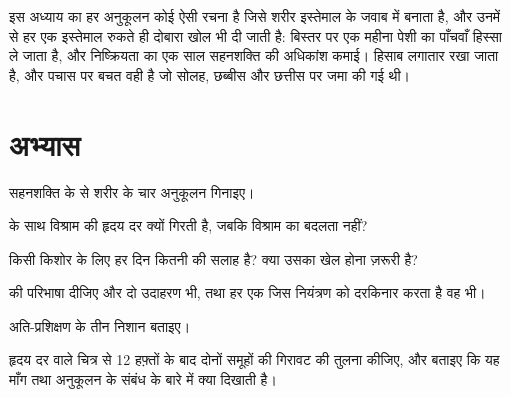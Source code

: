 \begin{remark}[शरीर हिसाब रखता है]\label{rem:g10:sport-and-health:account}
इस अध्याय का हर अनुकूलन कोई ऐसी रचना है जिसे शरीर इस्तेमाल के जवाब में
बनाता है, और उनमें से हर एक इस्तेमाल रुकते ही दोबारा खोल भी दी जाती है:
बिस्तर पर एक महीना पेशी का पाँचवाँ हिस्सा ले जाता है, और निष्क्रियता का
एक साल सहनशक्ति की अधिकांश कमाई। हिसाब लगातार रखा जाता है, और पचास पर बचत
वही है जो सोलह, छब्बीस और छत्तीस पर जमा की गई थी।
\end{remark}

\section{अभ्यास}

\begin{exercise}[$\star$]\label{exo:g10:sport-and-health:1}
सहनशक्ति के  से शरीर के चार अनुकूलन गिनाइए।
\end{exercise}

\begin{exercise}[$\star$]\label{exo:g10:sport-and-health:2}
 के साथ विश्राम की हृदय दर क्यों गिरती है, जबकि विश्राम का
 बदलता नहीं?
\end{exercise}

\begin{exercise}[$\star$]\label{exo:g10:sport-and-health:3}
किसी किशोर के लिए हर दिन कितनी  की सलाह है? क्या उसका खेल
होना ज़रूरी है?
\end{exercise}

\begin{exercise}[$\star$]\label{exo:g10:sport-and-health:4}
 की परिभाषा दीजिए और दो उदाहरण भी, तथा हर एक जिस नियंत्रण को
दरकिनार करता है वह भी।
\end{exercise}

\begin{exercise}[$\star$]\label{exo:g10:sport-and-health:5}
अति-प्रशिक्षण के तीन निशान बताइए।
\end{exercise}

\begin{exercise}[$\star\star$]\label{exo:g10:sport-and-health:6}
हृदय दर वाले चित्र से 12 हफ़्तों के बाद दोनों समूहों की गिरावट की तुलना
कीजिए, और बताइए कि यह माँग तथा अनुकूलन के संबंध के बारे में क्या दिखाती
है।
\end{exercise}

